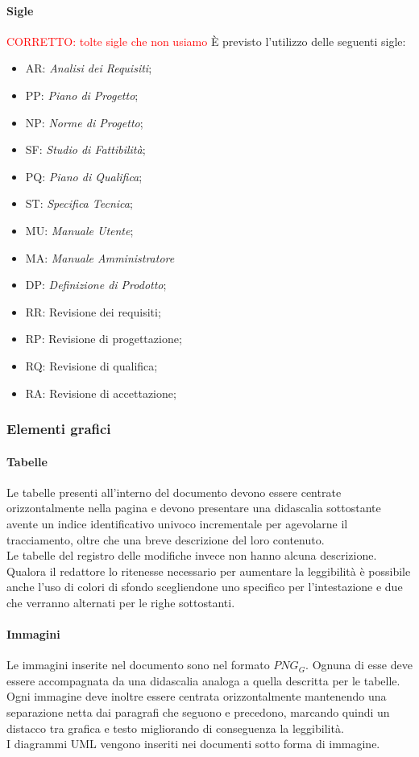		\paragraph{Sigle} \Spazio
		\textcolor{red}{CORRETTO: tolte sigle che non usiamo}
		È previsto l’utilizzo delle seguenti sigle:
		\begin{itemize}
			\item AR: \textit{Analisi dei Requisiti};
			\item PP: \textit{Piano di Progetto};
			\item NP: \textit{Norme di Progetto};
			\item SF: \textit{Studio di Fattibilità};
			\item PQ: \textit{Piano di Qualifica};
			\item ST: \textit{Specifica Tecnica};
			\item MU: \textit{Manuale Utente};	
			\item MA: \textit{Manuale Amministratore}
			\item DP: \textit{Definizione di Prodotto};
			\item RR: Revisione dei requisiti;
			\item RP: Revisione di progettazione;
			\item RQ: Revisione di qualifica;
			\item RA: Revisione di accettazione;
		\end{itemize}
		
	\subsubsection{Elementi grafici}
		\paragraph{Tabelle}\Spazio
		Le tabelle presenti all'interno del documento devono essere centrate orizzontalmente nella pagina e devono presentare una didascalia sottostante avente un indice identificativo univoco incrementale per agevolarne il tracciamento, oltre che una breve descrizione del loro contenuto.\\
		Le tabelle del registro delle modifiche invece non hanno alcuna descrizione.
Qualora il redattore lo ritenesse necessario per aumentare la leggibilità è possibile anche l'uso di colori di sfondo scegliendone uno specifico per l'intestazione e due che verranno alternati per le righe sottostanti.

		\paragraph{Immagini}\Spazio
		Le immagini inserite nel documento sono nel formato $PNG_G$. Ognuna di esse deve essere accompagnata da una didascalia analoga a quella descritta per le tabelle. \\
		Ogni immagine deve inoltre essere centrata orizzontalmente mantenendo una separazione netta dai paragrafi che seguono e precedono, marcando quindi un distacco tra grafica e testo migliorando di conseguenza la leggibilità. \\
		I diagrammi UML vengono inseriti nei documenti sotto forma di immagine.
